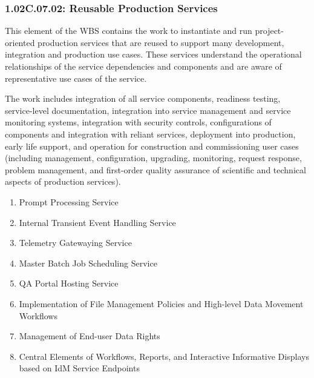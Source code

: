 \subsubsection{1.02C.07.02: Reusable Production Services}

This element of the WBS contains the work to instantiate and run project-oriented production services that are reused to support many development, integration and production use cases.
These services understand the operational relationships of the service dependencies and components and are aware of representative use cases of the service.

The work includes integration of all service components, readiness testing, service-level documentation, integration into service management and service monitoring systems, integration with security controls, configurations of components and integration with reliant services, deployment into production, early life support, and operation for construction and commissioning user cases (including management, configuration, upgrading, monitoring, request response, problem management, and first-order quality assurance of scientific and technical aspects of production services).

\begin{enumerate}

  \item{Prompt Processing Service}
  \item{Internal Transient Event Handling Service}
  \item{Telemetry Gatewaying Service}
  \item{Master Batch Job Scheduling Service}
  \item{QA Portal Hosting Service}
  \item{Implementation of File Management Policies and High-level Data Movement Workflows}
  \item{Management of End-user Data Rights}
  \item{Central Elements of Workflows, Reports, and Interactive Informative Displays based on IdM Service Endpoints}

\end{enumerate}

